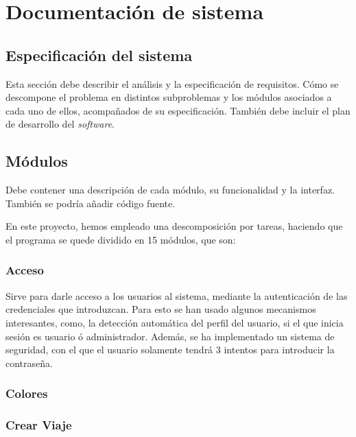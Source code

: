 

\section{Documentación de sistema}

\subsection{Especificación del sistema}

Esta sección debe describir el análisis y la especificación de requisitos. Cómo se descompone el problema en distintos subproblemas y los módulos asociados a cada uno de ellos, acompañados de su especificación. También debe incluir el plan de desarrollo del \textit{software}.

\subsection{Módulos}

Debe contener una descripción de cada módulo, su funcionalidad y la interfaz. También se podría añadir código fuente.

En este proyecto, hemos empleado una descomposición por tareas, haciendo que el programa se quede dividido en 15 módulos, que son:

\subsubsection{Acceso}

Sirve para darle acceso a los usuarios al sistema, mediante la autenticación de las credenciales que introduzcan. Para esto se han usado algunos mecanismos interesantes,
como, la detección automática del perfil del usuario, si el que inicia sesión es usuario ó administrador. Además, se ha implementado un sistema de seguridad,
con el que el usuario solamente tendrá 3 intentos para introducir la contraseña.
\bigskip
%

\subsubsection{Colores}

\bigskip
%

\subsubsection{Crear Viaje}

